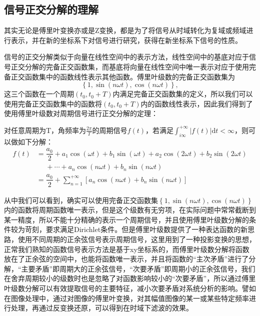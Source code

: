 \documentclass{hitreport}
\begin{document}
\subsection{信号正交分解的理解}

其实无论是傅里叶变换亦或是Z变换，都是为了将信号从时域转化为复域或频域进行表示，并在新的坐标系下对信号进行研究，获得在新坐标系下信号的性质。

信号的正交分解类似于向量在线性空间中的表示方法，线性空间中的基底对应于信号正交分解的完备正交函数集，而基底将向量在线性空间中唯一表示对应于使用完备正交函数集中的函数线性表示其他函数。傅里叶级数的完备正交函数集为$$\left\{1,\sin\left(n\omega t\right),\cos\left(n\omega t\right)\right\},$$这三个函数在一个周期$\left(t_0,t_0+T\right)$内满足完备正交函数集的定义，所以我们可以使用完备正交函数集中的函数将$\left(t_0,t_0+T\right)$内的函数线性表示，因此我们得到了使用傅里叶级数对周期信号进行正交分解的定理：
\begin{theorem}
对任意周期为T，角频率为$\frac{2\pi}{T}$的周期信号$f\left(t\right)$，若满足$\int_{i\infty}^{+\infty}{\lvert f\left(t\right) \rvert\mathrm{d}t}<\infty$，则可以做如下分解：
\begin{align}
f\left(t\right) &=\dfrac{a_0}{2}+a_1\cos \left(\omega t\right)+b_1\sin \left(\omega t\right)+a_2\cos \left(2\omega t\right)+b_2\sin \left(2\omega t\right)\\
& \ \ \ \ \ \ +\cdots+a_n\cos \left(n\omega t\right)+b_n\sin \left(n\omega t\right)\\
&=\dfrac{a_0}{2}+\sum\limits_{n=1}^{+\infty}\left[a_n\cos \left(n\omega t\right)+b_n\sin \left(n\omega t\right)\right]
\end{align}
\end{theorem}

从中我们可以看到，确实可以使用完备正交函数集$\left\{1,\sin\left(n\omega t\right),\cos\left(n\omega t\right)\right\}$内的函数将周期函数唯一表示，但是这个级数有无穷项，在实际问题中常常截断到某一精度，所以不能十分精确的表示一个周期信号，并且使用傅里叶级数分解的条件较为苛刻，要求满足Dirichlet条件。但是傅里叶级数提供了一种表达函数的新思路，使用不同周期的正余弦信号表示周期信号，这里用到了一种投影变换的思想，正常我们熟知的函数信号表示方法是基于xy坐标系的，而傅里叶级数分解将函数放在了正余弦的空间中，也能将函数唯一表示，并且将函数的“主次矛盾”进行了分解，“主要矛盾”即周期大的正余弦信号，“次要矛盾”即周期小的正余弦信号，我们在舍弃周期较小的级数时也是忽略了对函数影响较小的“次要矛盾”，所以通过傅里叶级数分解可以有效提取信号的主要特征，减小次要矛盾对系统分析的影响。譬如在图像处理中，通过对图像的傅里叶变换，对其幅值图像的某一或某些特定频率进行处理，再通过反变换还原，可以得到在时域下滤波的效果。
\end{document}
